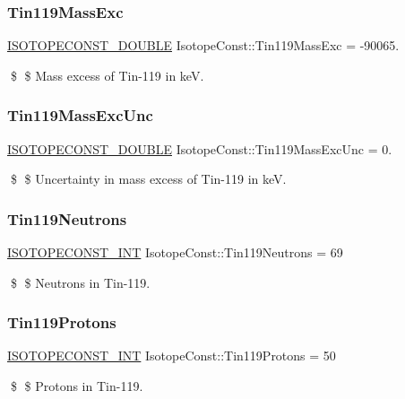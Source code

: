 \subsubsection{\texorpdfstring{Tin119\+Mass\+Exc}{Tin119MassExc}}
{\footnotesize\ttfamily \mbox{\hyperlink{group___isotope_const-_macros_ga8f45a7272ce02c0b4c65c44636ed719a}{I\+S\+O\+T\+O\+P\+E\+C\+O\+N\+S\+T\+\_\+\+D\+O\+U\+B\+LE}} Isotope\+Const\+::\+Tin119\+Mass\+Exc = -\/90065.}

\$ \$ Mass excess of Tin-\/119 in keV. \mbox{\label{group___isotope_const-_tin-_sn119_ga31e37da433ba152f34a5e3794ea7505c}} 
\subsubsection{\texorpdfstring{Tin119\+Mass\+Exc\+Unc}{Tin119MassExcUnc}}
{\footnotesize\ttfamily \mbox{\hyperlink{group___isotope_const-_macros_ga8f45a7272ce02c0b4c65c44636ed719a}{I\+S\+O\+T\+O\+P\+E\+C\+O\+N\+S\+T\+\_\+\+D\+O\+U\+B\+LE}} Isotope\+Const\+::\+Tin119\+Mass\+Exc\+Unc = 0.}

\$ \$ Uncertainty in mass excess of Tin-\/119 in keV. \mbox{\label{group___isotope_const-_tin-_sn119_gae4e6c19acc94b004e9d3b93b3977fd33}} 
\subsubsection{\texorpdfstring{Tin119\+Neutrons}{Tin119Neutrons}}
{\footnotesize\ttfamily \mbox{\hyperlink{group___isotope_const-_macros_ga5f18360b3e99483a35c32d789e62621c}{I\+S\+O\+T\+O\+P\+E\+C\+O\+N\+S\+T\+\_\+\+I\+NT}} Isotope\+Const\+::\+Tin119\+Neutrons = 69}

\$ \$ Neutrons in Tin-\/119. \mbox{\label{group___isotope_const-_tin-_sn119_gab389864695aee25d3638fef6e05e0efa}} 
\subsubsection{\texorpdfstring{Tin119\+Protons}{Tin119Protons}}
{\footnotesize\ttfamily \mbox{\hyperlink{group___isotope_const-_macros_ga5f18360b3e99483a35c32d789e62621c}{I\+S\+O\+T\+O\+P\+E\+C\+O\+N\+S\+T\+\_\+\+I\+NT}} Isotope\+Const\+::\+Tin119\+Protons = 50}

\$ \$ Protons in Tin-\/119. 